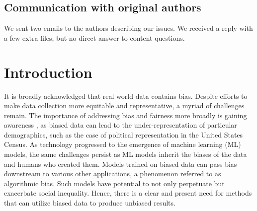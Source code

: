 \subsection{Communication with original authors} 
We sent two emails to the authors describing our issues. We received a reply with a few extra files, but no direct answer to content questions.






\clearpage

\section{Introduction}

It is broadly acknowledged that real world data contains bias. Despite efforts to make data collection more equitable and representative, a myriad of challenges remain. The importance of addressing bias and fairness more broadly is gaining awareness \citep{DBLP:journals/csur/MehrabiMSLG21}, as biased data can lead to the under-representation of particular demographics, such as the case of political representation in the United States Census\citep{hare_2019}. As technology progressed to the emergence of machine learning (ML) models, the same challenges persist as ML models inherit the biases of the data and humans who created them. Models trained on biased data can pass bias downstream to various other applications, a phenomenon referred to as algorithmic bias\citep{johnson_2020}. Such models have potential to not only perpetuate but exacerbate social inequality. Hence, there is a clear and present need for methods that can utilize biased data to produce unbiased results. 

